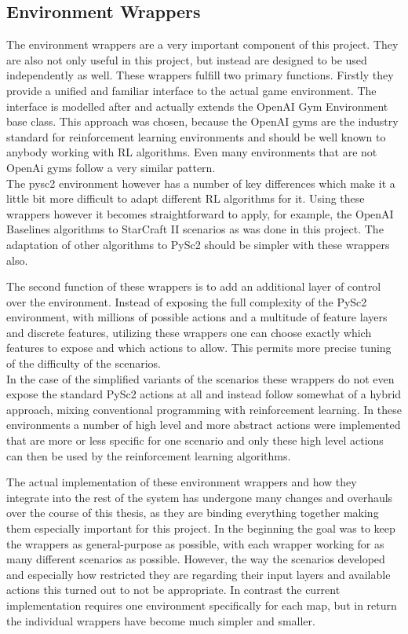 \subsection{Environment Wrappers}
\label{sec:wrappers}
The environment wrappers are a very important component of this project. They are also not only useful in this project, but instead are designed to be used independently as well. These wrappers fulfill two primary functions. Firstly they provide a unified and familiar interface to the actual game environment. The interface is modelled after and actually extends the OpenAI Gym Environment base class. This approach was chosen, because the OpenAI gyms are the industry standard for reinforcement learning environments and should be well known to anybody working with RL algorithms. Even many environments that are not OpenAi gyms follow a very similar pattern.\\
The pysc2 environment however has a number of key differences which make it a little bit more difficult to adapt different RL algorithms for it. Using these wrappers however it becomes straightforward to apply, for example, the OpenAI Baselines algorithms to StarCraft II scenarios as was done in this project. The adaptation of other algorithms to PySc2 should be simpler with these wrappers also.

The second function of these wrappers is to add an additional layer of control over the environment.
Instead of exposing the full complexity of the PySc2 environment, with millions of possible actions and a multitude of feature layers and discrete features, utilizing these wrappers one can choose exactly which features to expose and which actions to allow. This permits more precise tuning of the difficulty of the scenarios. \\
In the case of the simplified variants of the scenarios these wrappers do not even expose the standard PySc2 actions at all and instead follow somewhat of a hybrid approach, mixing conventional programming with reinforcement learning. In these environments a number of high level and more abstract actions were implemented that are more or less specific for one scenario and only these high level actions can then be used by the reinforcement learning algorithms.

The actual implementation of these environment wrappers and how they integrate into the rest of the system has undergone many changes and overhauls over the course of this thesis, as they are binding everything together making them especially important for this project.
In the beginning the goal was to keep the wrappers as general-purpose as possible, with each wrapper working for as many different scenarios as possible. However, the way the scenarios developed and especially how restricted they are regarding their input layers and available actions this turned out to not be appropriate. In contrast the current implementation requires one environment specifically for each map, but in return the individual wrappers have become much simpler and smaller.

